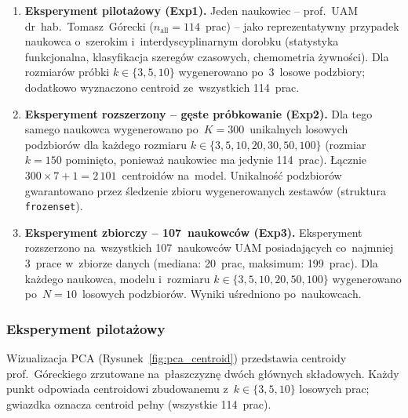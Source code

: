 \begin{enumerate}
    \item \textbf{Eksperyment pilotażowy (Exp1).}
    Jeden naukowiec -- prof.~UAM dr~hab.~Tomasz~Górecki
    ($n_\mathrm{all} = 114$~prac) -- jako reprezentatywny przypadek
    naukowca o~szerokim i~interdyscyplinarnym dorobku
    (statystyka funkcjonalna, klasyfikacja szeregów czasowych,
    chemometria żywności).
    Dla rozmiarów próbki $k \in \{3, 5, 10\}$ wygenerowano po~3~losowe
    podzbiory; dodatkowo wyznaczono centroid ze~wszystkich 114~prac.

    \item \textbf{Eksperyment rozszerzony -- gęste próbkowanie (Exp2).}
    Dla tego samego naukowca wygenerowano po~$K = 300$~unikalnych
    losowych podzbiorów dla każdego rozmiaru
    $k \in \{3, 5, 10, 20, 30, 50, 100\}$
    (rozmiar~$k = 150$ pominięto, ponieważ naukowiec ma jedynie
    114~prac).
    Łącznie $300 \times 7 + 1 = 2\,101$~centroidów na~model.
    Unikalność podzbiorów gwarantowano przez śledzenie zbioru
    wygenerowanych zestawów (struktura \texttt{frozenset}).

    \item \textbf{Eksperyment zbiorczy -- 107~naukowców (Exp3).}
    Eksperyment rozszerzono na~wszystkich 107~naukowców UAM
    posiadających co~najmniej 3~prace w~zbiorze danych
    (mediana: 20~prac, maksimum: 199~prac).
    Dla każdego naukowca, modelu i~rozmiaru
    $k \in \{3, 5, 10, 20, 50, 100\}$
    wygenerowano po~$N = 10$~losowych podzbiorów.
    Wyniki uśredniono po~naukowcach.
\end{enumerate}

\subsubsection{Eksperyment pilotażowy}


Wizualizacja PCA (Rysunek~\ref{fig:pca_centroid}) przedstawia centroidy
prof.~Góreckiego zrzutowane na~płaszczyznę dwóch głównych składowych.
Każdy punkt odpowiada centroidowi zbudowanemu z~$k \in \{3,5,10\}$
losowych prac; gwiazdka oznacza centroid pełny (wszystkie 114~prac).

